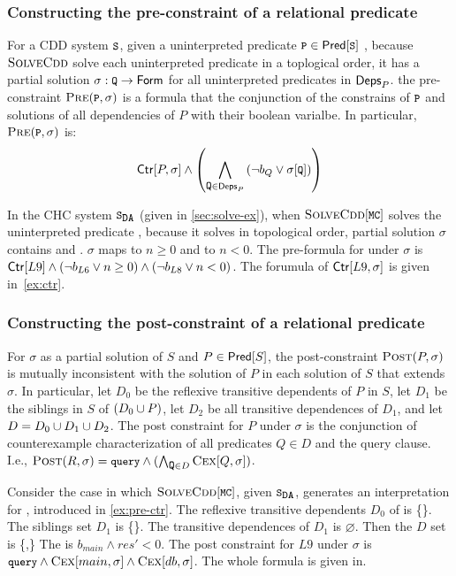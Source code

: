\subsubsection{Constructing the pre-constraint of a relational predicate}
\label{sec:cons-pre}
%
For a CDD system $\cc{S}$, given a uninterpreted predicate $\cc{P} \in \predof{\cc{S}}$
, because $\textsc{SolveCdd}$ solve each uninterpreted predicate in a toplogical order, 
it has a partial solution $\sigma : \cc{Q} \to \formula$ for all uninterpreted predicates in
$\mathsf{Deps}_{P}$.
%
the pre-constraint $\prectr(\cc{P},\sigma)$ is a formula that the conjunction of the constrains
of $\cc{P}$ and solutions of all dependencies of $P$ with their boolean varialbe.
%
In particular, $\prectr(\cc{P},\sigma)$ is:
\[\ctrof{P,\sigma} \land
\left(
\bigland_{\cc{Q} \in \depsof{P}}
\left(\neg b_Q \lor \sigma[ \cc{Q} ]  \right)
\right)
\]
%
\begin{ex}
  \label{ex:pre-ctr}
  In the CHC system $\mcchc$ (given in \autoref{sec:solve-ex}), 
  when $\mcsolve$ solves the uninterpreted predicate , because it solves
  in topological order, partial solution $\sigma$ contains  and .
  $\sigma$ maps
   to $n \ge 0$ and  to $n < 0$.
  The pre-formula for  under $\sigma$ is $\mathsf{Ctr}[L9] \land (\neg b_{L6} \lor n \ge 0) \land (\neg b_{L8} \lor n < 0)$.
  The forumula of $\mathsf{Ctr}[L9,\sigma]$ is given in~\autoref{ex:ctr}.
\end{ex}

\subsubsection{Constructing the post-constraint of a relational
  predicate}
\label{sec:cons-ctx}
%
For $\sigma$ as a partial solution of
$S$ and $P \in \mathsf{Pred}[ S ]$, the post-constraint $\textsc{Post}(P, \sigma)$ is mutually
inconsistent with the solution of $P$ in each solution of
$S$ that extends $\sigma$.
In particular, let $D_0$ be the reflexive transitive dependents of $P$
in $S$,
let $D_1$ be the siblings in $S$ of
$(D_0 \cup {P})$,
%
let $D_2$ be all transitive dependences of $D_1$, and
let $D = D_0 \cup D_1 \cup D_2$.
The post constraint for $P$ under $\sigma$ is the conjunction of
counterexample characterization of all predicates $Q \in D$ and the query clause.
%
I.e., $\postctr(R, \sigma) =\cc{query} \land (\bigland_{\cc{Q} \in D} \vc{Q,\sigma})$.
\begin{ex}
  \label{ex:ctx-ctr}
  Consider the case in which $\mcsolve$, given $\mcchc$, generates an
  interpretation for , introduced in \autoref{ex:pre-ctr}.
  The reflexive transitive dependents $D_0$ of  is \{\}.
  The siblings set $D_1$ is \{\}.
  The transitive dependences of $D_1$ is $\varnothing$. 
  Then the $D$ set is \{,\}
  The  is $b_{main} \land res'<0$.
  The post constraint for $L9$ under $\sigma$ is $\cc{query} \land \vc{main,\sigma} \land \vc{db,\sigma}$.
  The whole formula is given in. 
\end{ex}

